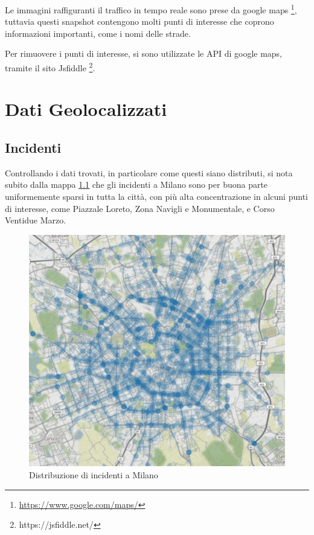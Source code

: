 \documentclass[a4paper]{report}
\begin{document}
Le immagini raffiguranti il traffico in tempo reale sono prese da google maps
\footnote{\url{https://www.google.com/maps/}}, 
tuttavia questi snapshot contengono molti punti di interesse che coprono informazioni importanti, 
come i nomi delle strade.

Per rimuovere i punti di interesse, si sono utilizzate le API di google maps, tramite il sito Jsfiddle
\footnote{https://jsfiddle.net/}.


\chapter{Dati Geolocalizzati}

\section{Incidenti}

Controllando i dati trovati, in particolare come questi siano distributi, 
si nota subito dalla mappa \ref{fig:geo-incidenti} che gli incidenti a Milano sono per buona parte uniformemente sparsi in tutta la città, 
con più alta concentrazione in alcuni punti di interesse, come Piazzale Loreto, Zona Navigli 
e Monumentale, e Corso Ventidue Marzo.

\begin{figure}
    \includegraphics[width=\linewidth]{../src/incidenti/geo_incidenti.png}
    \caption{Distribuzione di incidenti a Milano}
    \label{fig:geo-incidenti}
\end{figure}
\end{document}
